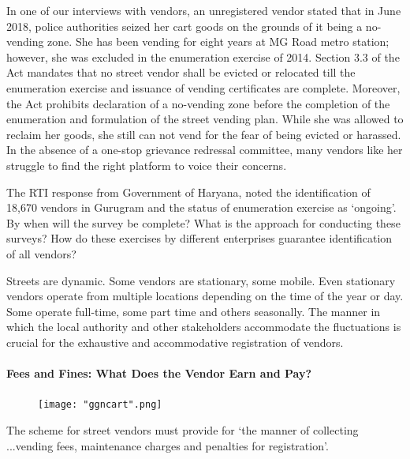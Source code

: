 \documentclass[a4paper, 12pt, twoside, table]{article}
\begin{document}
{{\begin{mdframed}[backgroundcolor=gray!20]
In one of our interviews with vendors, an unregistered vendor stated that in June 2018, police authorities seized her cart goods on the grounds of it being a no-vending zone. She has been vending for eight years at MG Road metro station; however, she was excluded in the enumeration exercise of 2014. Section 3.3 of the Act mandates that no street vendor shall be evicted or relocated till the enumeration exercise and issuance of vending certificates are complete. Moreover, the Act prohibits declaration of a no-vending zone before the completion of the enumeration and formulation of the street vending plan. While she was allowed to reclaim her goods, she still can not vend for the fear of being evicted or harassed. In the absence of a one-stop grievance redressal committee, many vendors like her struggle to find the right platform to voice their concerns.
\end{mdframed}

The RTI response from Government of Haryana, noted the identification of 18,670 vendors in Gurugram and the status of enumeration exercise as ‘ongoing’. By when will the survey be complete? What is the approach for conducting these surveys? How do these exercises by different enterprises guarantee identification of all vendors?

Streets are dynamic. Some vendors are stationary, some mobile. Even stationary vendors operate from multiple locations depending on the time of the year or day. Some operate full-time, some part time and others seasonally. The manner in which the local authority and other stakeholders accommodate the fluctuations is crucial for the exhaustive and accommodative registration of vendors.

\paragraph*{Fees and Fines: What Does the Vendor Earn and Pay?}


\begin{figure}
\vspace{0pt}

\centering
\texttt{[image: "ggncart".png]}

\end{figure}

The scheme for street vendors must provide for `the manner of collecting ...vending fees, maintenance charges and penalties for registration'.

}}
\end{document}
